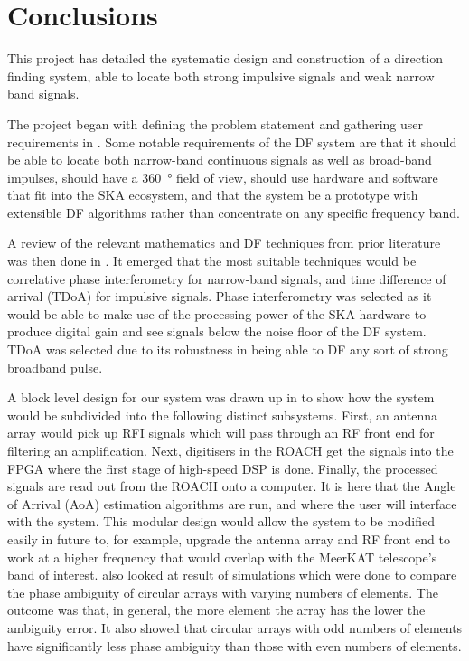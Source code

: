 \chapter{Conclusions}
\label{ch:conclusions}
\graphicspath{{./img/conclusions/}}

This project has detailed the systematic design and construction of a direction finding system, able to locate both strong impulsive signals and weak narrow band signals. 

The project began with defining the problem statement and gathering user requirements in . Some notable requirements of the DF system are that it should be able to locate both narrow-band continuous signals as well as broad-band impulses, should have a \SI{360}{\degree} field of view, should use hardware and software that fit into the SKA ecosystem, and that the system be a prototype with extensible DF algorithms rather than concentrate on any specific frequency band.

A review of the relevant mathematics and DF techniques from prior literature was then done in . It emerged that the most suitable techniques would be correlative phase interferometry for narrow-band signals, and time difference of arrival (TDoA) for impulsive signals. Phase interferometry was selected as it would be able to make use of the processing power of the SKA hardware to produce digital gain and see signals below the noise floor of the DF system. TDoA was selected due to its robustness in being able to DF any sort of strong broadband pulse.

A block level design for our system was drawn up in  to show how the system would be subdivided into the following distinct subsystems. First, an antenna array would pick up RFI signals which will pass through an RF front end for filtering an amplification. Next, digitisers in the ROACH get the signals into the FPGA where the first stage of high-speed DSP is done. Finally, the processed signals are read out from the ROACH onto a computer. It is here that the Angle of Arrival (AoA) estimation algorithms are run, and where the user will interface with the system. This modular design would allow the system to be modified easily in future to, for example, upgrade the antenna array and RF front end to work at a higher frequency that would overlap with the MeerKAT telescope's band of interest.  also looked at result of simulations which were done to compare the phase ambiguity of circular arrays with varying numbers of elements. The outcome was that, in general, the more element the array has the lower the ambiguity error. It also showed that circular arrays with odd numbers of elements have significantly less phase ambiguity than those with even numbers of elements.

